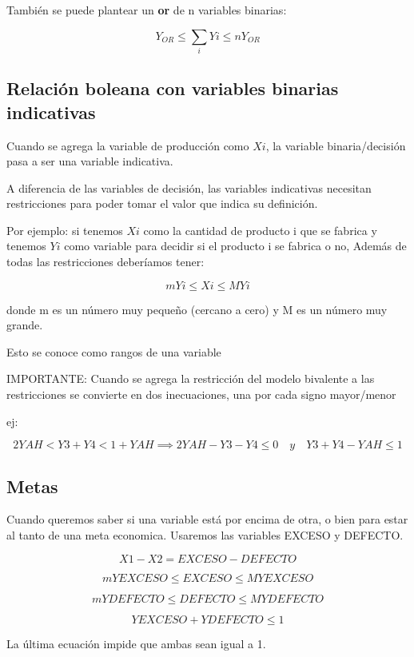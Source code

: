 \documentclass[titlepage,a4paper]{article}
\begin{document}
También se puede plantear un \textbf{or} de n variables binarias:

$$
Y_{OR} \leq \sum_{i} Yi \leq n Y_{OR} 
$$

\subsection{Relación boleana con variables binarias indicativas}

Cuando se agrega la variable de producción como $Xi$, la variable binaria/decisión pasa a ser una variable indicativa. 

A diferencia de las variables de decisión, las variables indicativas necesitan restricciones para poder tomar el valor que indica su definición.

Por ejemplo: si tenemos $Xi$ como la cantidad de producto i que se fabrica y tenemos $Yi$ como variable para decidir si el producto i se fabrica o no,
Además de todas las restricciones deberíamos tener:

$$m Yi \leq Xi \leq M Yi$$

donde m es un número muy pequeño (cercano a cero) y M es un número muy
grande.

Esto se conoce como rangos de una variable

IMPORTANTE: Cuando se agrega la restricción del modelo bivalente a las restricciones se convierte en dos inecuaciones, una por cada signo mayor/menor

ej:
 
$$ 
2YAH < Y3 + Y4 < 1 + YAH \implies 2YAH - Y3 - Y4 \leq 0 \quad y \quad Y3 + Y4 - YAH \leq 1 
$$

\vspace{0.5cm}

\subsection{Metas}

Cuando queremos saber si una variable está por encima de otra, o bien para estar al tanto de una meta economica. Usaremos las variables EXCESO y DEFECTO. 

$$ X1 - X2 = EXCESO - DEFECTO $$

$$ m YEXCESO \leq EXCESO \leq M YEXCESO $$

$$ m YDEFECTO \leq DEFECTO \leq M YDEFECTO $$

$$ YEXCESO + YDEFECTO \leq 1 $$

La última ecuación impide que ambas sean igual a 1. 
\end{document}
